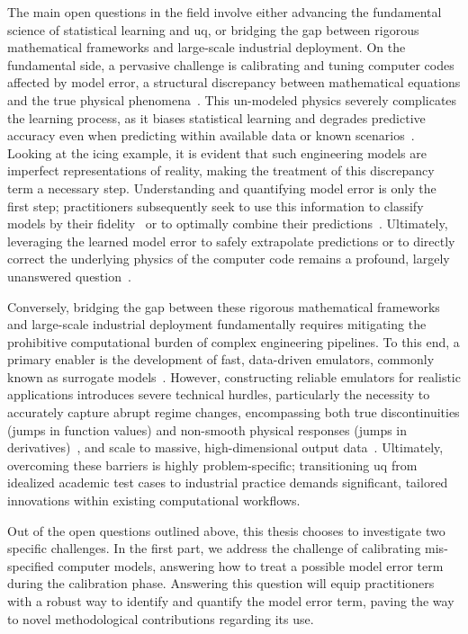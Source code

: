 \smallskip
The main open questions in the field involve either advancing the fundamental science of statistical learning and \gls{uq}, or bridging the gap between rigorous mathematical frameworks and large-scale industrial deployment. On the fundamental side, a pervasive challenge is calibrating and tuning computer codes affected by model error, a structural discrepancy between mathematical equations and the true physical phenomena~\cite{leoni}. This un-modeled physics severely complicates the learning process, as it biases statistical learning and degrades predictive accuracy even when predicting within available data or known scenarios~\cite{uq_theory}. Looking at the icing example, it is evident that such engineering models are imperfect representations of reality, making the treatment of this discrepancy term a necessary step. Understanding and quantifying model error is only the first step; practitioners subsequently seek to use this information to classify models by their fidelity~\cite{phd3} or to optimally combine their predictions~\cite{multif}. Ultimately, leveraging the learned model error to safely extrapolate predictions or to directly correct the underlying physics of the computer code remains a profound, largely unanswered question~\cite{uq_theory}.

\smallskip
Conversely, bridging the gap between these rigorous mathematical frameworks and large-scale industrial deployment fundamentally requires mitigating the prohibitive computational burden of complex engineering pipelines. To this end, a primary enabler is the development of fast, data-driven emulators, commonly known as surrogate models~\cite{uq_theory}. However, constructing reliable emulators for realistic applications introduces severe technical hurdles, particularly the necessity to accurately capture abrupt regime changes, encompassing both true discontinuities (jumps in function values) and non-smooth physical responses (jumps in derivatives)~\cite{Sudret2023}, and scale to massive, high-dimensional output data~\cite{leoni}. Ultimately, overcoming these barriers is highly problem-specific; transitioning \gls{uq} from idealized academic test cases to industrial practice demands significant, tailored innovations within existing computational workflows.

\smallskip
Out of the open questions outlined above, this thesis chooses to investigate two specific challenges. In the first part, we address the challenge of calibrating mis-specified computer models, answering how to treat a possible model error term during the calibration phase. Answering this question will equip practitioners with a robust way to identify and quantify the model error term, paving the way to novel methodological contributions regarding its use. 

